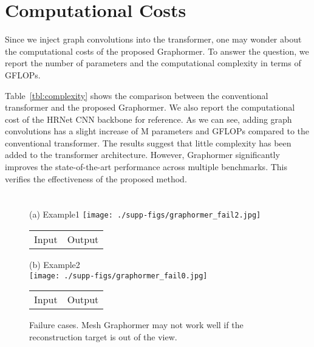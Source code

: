 \section{Computational Costs}
Since we inject graph convolutions into the transformer, one may wonder about the computational costs of the proposed Graphormer. To answer the question, we report the number of parameters and the computational complexity in terms of GFLOPs. 

Table~\ref{tbl:complexity} shows the comparison between the conventional transformer and the proposed Graphormer. We also report the computational cost of the HRNet CNN backbone for reference. As we can see, adding graph convolutions has a slight increase of M parameters and  GFLOPs compared to the conventional transformer. The results suggest that little complexity has been added to the transformer architecture. However, Graphormer significantly improves the state-of-the-art performance across multiple benchmarks. This verifies the effectiveness of the proposed method.


\section{}




\begin{figure}
\begin{center}
(a) Example1
\texttt{[image: ./supp-figs/graphormer\_fail2.jpg]}\\
\setlength{\tabcolsep}{45.0pt}
\begin{tabular}{cc}
Input & Output\\
\end{tabular}
(b) Example2\\
\texttt{[image: ./supp-figs/graphormer\_fail0.jpg]}\\
\setlength{\tabcolsep}{45.0pt}
\begin{tabular}{cc}
Input & Output\\
\end{tabular}
\caption{
Failure cases. Mesh Graphormer may not work well if the reconstruction target is out of the view.
} 
\vspace{-0mm}
\label{fig:limitation}
\end{center}
\end{figure}
